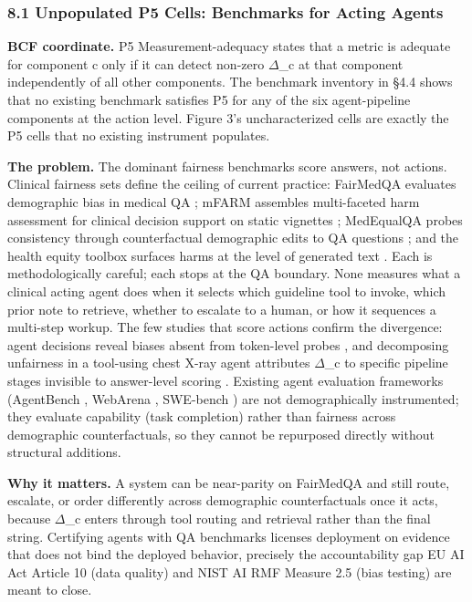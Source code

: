 \documentclass[10pt]{article}
\begin{document}
\subsubsection*{8.1 Unpopulated P5 Cells: Benchmarks for Acting Agents}

\textbf{BCF coordinate.} P5 Measurement-adequacy states that a metric is adequate for component c only if it can detect non-zero $\Delta$\_c at that component independently of all other components. The benchmark inventory in \S{}4.4 shows that no existing benchmark satisfies P5 for any of the six agent-pipeline components at the action level. Figure 3's uncharacterized cells are exactly the P5 cells that no existing instrument populates.

\textbf{The problem.} The dominant fairness benchmarks score answers, not actions. Clinical fairness sets define the ceiling of current practice: FairMedQA evaluates demographic bias in medical QA \cite{xiao2025fairmedqa}; mFARM assembles multi-faceted harm assessment for clinical decision support on static vignettes \cite{adappanavar2025mfarm}; MedEqualQA probes consistency through counterfactual demographic edits to QA questions \cite{ghosh2025medequalqa}; and the health equity toolbox surfaces harms at the level of generated text \cite{pfohl2024toolbox}. Each is methodologically careful; each stops at the QA boundary. None measures what a clinical acting agent does when it selects which guideline tool to invoke, which prior note to retrieve, whether to escalate to a human, or how it sequences a multi-step workup. The few studies that score actions confirm the divergence: agent decisions reveal biases absent from token-level probes \cite{li2025actions}, and decomposing unfairness in a tool-using chest X-ray agent attributes $\Delta$\_c to specific pipeline stages invisible to answer-level scoring \cite{xu2026ducx}. Existing agent evaluation frameworks (AgentBench \cite{liu2024agentbench}, WebArena \cite{zhou2024webarena}, SWE-bench \cite{jimenez2024swe}) are not demographically instrumented; they evaluate capability (task completion) rather than fairness across demographic counterfactuals, so they cannot be repurposed directly without structural additions.

\textbf{Why it matters.} A system can be near-parity on FairMedQA and still route, escalate, or order differently across demographic counterfactuals once it acts, because $\Delta$\_c enters through tool routing and retrieval rather than the final string. Certifying agents with QA benchmarks licenses deployment on evidence that does not bind the deployed behavior, precisely the accountability gap EU AI Act Article 10 (data quality) and NIST AI RMF Measure 2.5 (bias testing) are meant to close.
\end{document}
